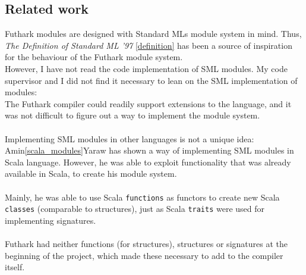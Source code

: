 \subsection{Related work}
Futhark modules are designed with Standard MLs module system in mind. Thus, \textit{The
Definition of Standard ML '97} \ref{definition} has been a source of inspiration
for the behaviour of the Futhark module system. \\
However, I have not read the code implementation of SML modules. My code supervisor and I did not find it necessary to lean on the SML implementation of modules:\\
The Futhark compiler could readily support extensions to the language, and it was not difficult to
figure out a way to implement the module system.
\\
\\
Implementing SML modules in other languages is not a unique idea:\\
Amin\ref{scala_modules}Yaraw has shown a way of implementing SML modules in Scala
language. However, he was able to exploit functionality that was already available in
Scala, to create his module system.
\\
\\
Mainly, he was able to use Scala \texttt{functions} as functors to create new Scala
\texttt{classes} (comparable to structures), just as Scala
\texttt{traits} were used for implementing signatures.
\\
\\
Futhark had neither functions (for structures), structures or signatures at the
beginning of the project, which made these necessary to add to the compiler itself.